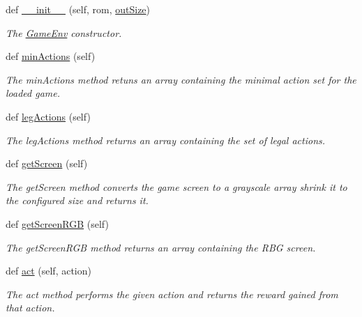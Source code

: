 \begin{DoxyCompactItemize}
\item 
def \hyperlink{classDQN-Deepmind-NIPS-2013_1_1GameEnv_1_1GameEnv_a787af9d0e467c038e970246ae4dfdc08}{\+\_\+\+\_\+init\+\_\+\+\_\+} (self, rom, \hyperlink{classDQN-Deepmind-NIPS-2013_1_1GameEnv_1_1GameEnv_ae8e7e56bd996ea0ce4ece1ca32f6b54a}{out\+Size})
\begin{DoxyCompactList}\small\item\em The \hyperlink{classDQN-Deepmind-NIPS-2013_1_1GameEnv_1_1GameEnv}{Game\+Env} constructor. \end{DoxyCompactList}\item 
def \hyperlink{classDQN-Deepmind-NIPS-2013_1_1GameEnv_1_1GameEnv_a76014d9140e479757a52b9ceda06dd16}{min\+Actions} (self)
\begin{DoxyCompactList}\small\item\em The min\+Actions method retuns an array containing the minimal action set for the loaded game. \end{DoxyCompactList}\item 
def \hyperlink{classDQN-Deepmind-NIPS-2013_1_1GameEnv_1_1GameEnv_ab2efa70a8316abde73936602001654a6}{leg\+Actions} (self)
\begin{DoxyCompactList}\small\item\em The leg\+Actions method returns an array containing the set of legal actions. \end{DoxyCompactList}\item 
def \hyperlink{classDQN-Deepmind-NIPS-2013_1_1GameEnv_1_1GameEnv_a37712548267b91afddb6866fddf22b94}{get\+Screen} (self)
\begin{DoxyCompactList}\small\item\em The get\+Screen method converts the game screen to a grayscale array shrink it to the configured size and returns it. \end{DoxyCompactList}\item 
def \hyperlink{classDQN-Deepmind-NIPS-2013_1_1GameEnv_1_1GameEnv_a553c6eac3cac494bff5c9703dcfea2fe}{get\+Screen\+R\+GB} (self)
\begin{DoxyCompactList}\small\item\em The get\+Screen\+R\+GB method returns an array containing the R\+BG screen. \end{DoxyCompactList}\item 
def \hyperlink{classDQN-Deepmind-NIPS-2013_1_1GameEnv_1_1GameEnv_a675bec246ea3ed4506328deb5df64d4e}{act} (self, action)
\begin{DoxyCompactList}\small\item\em The act method performs the given action and returns the reward gained from that action. \end{DoxyCompactList}\item 

\end{DoxyCompactItemize}
